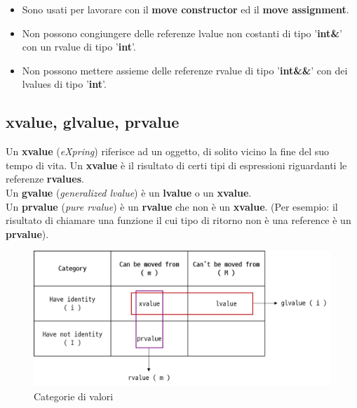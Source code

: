 \begin{itemize}
	\item \textsf{\small Sono usati per lavorare con il \textbf{move constructor} ed il \textbf{move assignment}.}
	\item \textsf{\small Non possono congiungere delle referenze lvalue non costanti di tipo '\textbf{int\&}' con un rvalue di tipo '\textbf{int}'.}
	\item \textsf{\small Non possono mettere assieme delle referenze rvalue di tipo '\textbf{int\&\&}' con dei lvalues di tipo '\textbf{int}'.}
\end{itemize}

\subsection{xvalue, glvalue, prvalue}

\textsf{\small Un \textbf{xvalue} (\emph{eXpring}) riferisce ad un oggetto, di solito vicino la fine del suo tempo di vita. Un \textbf{xvalue} è il risultato di certi tipi di espressioni riguardanti le referenze \textbf{rvalues}.} \\

\textsf{\small Un \textbf{gvalue} (\emph{generalized lvalue}) è un \textbf{lvalue} o un \textbf{xvalue}.} \\

\textsf{\small Un \textbf{prvalue} (\emph{pure rvalue}) è un \textbf{rvalue} che non è un \textbf{xvalue}. (Per esempio: il risultato di chiamare una funzione il cui tipo di ritorno non è una reference è un \textbf{prvalue}).} \\

\begin{figure}[H]
	\centering
	\includegraphics[width=1\textwidth, height=1\textheight, keepaspectratio]{./imgs/values_categories2.png}
	\caption{Categorie di valori}
	\label{fig:values_categories}
\end{figure}

